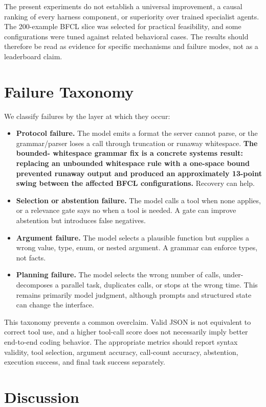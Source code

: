 \documentclass[conference]{IEEEtran}
\begin{document}
The present experiments do not establish a universal improvement, a causal ranking of every
harness component, or superiority over trained specialist agents. The 200-example BFCL slice
was selected for practical feasibility, and some configurations were tuned against related
behavioral cases. The results should therefore be read as evidence for specific mechanisms
and failure modes, not as a leaderboard claim.

\section{Failure Taxonomy}

We classify failures by the layer at which they occur:

\begin{itemize}
\item \textbf{Protocol failure.} The model emits a format the server cannot parse, or the
grammar/parser loses a call through truncation or runaway whitespace. \textbf{The bounded-
whitespace grammar fix is a concrete systems result: replacing an unbounded whitespace rule
with a one-space bound prevented runaway output and produced an approximately 13-point swing
between the affected BFCL configurations.} Recovery can help.
\item \textbf{Selection or abstention failure.} The model calls a tool when none applies, or a
relevance gate says no when a tool is needed. A gate can improve abstention but introduces
false negatives.
\item \textbf{Argument failure.} The model selects a plausible function but supplies a wrong
value, type, enum, or nested argument. A grammar can enforce types, not facts.
\item \textbf{Planning failure.} The model selects the wrong number of calls, under-decomposes a
parallel task, duplicates calls, or stops at the wrong time. This remains primarily model
judgment, although prompts and structured state can change the interface.
\end{itemize}

This taxonomy prevents a common overclaim. Valid JSON is not equivalent to correct tool use,
and a higher tool-call score does not necessarily imply better end-to-end coding behavior.
The appropriate metrics should report syntax validity, tool selection, argument accuracy,
call-count accuracy, abstention, execution success, and final task success separately.



\section{Discussion}
\end{document}
